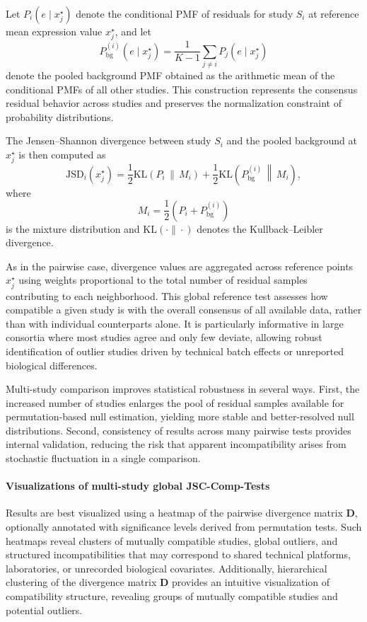 Let $P_i(e \mid x^\star_j)$ denote the conditional PMF of residuals for study $S_i$ at reference mean expression value $x^\star_j$, and let
\[
P_{\mathrm{bg}}^{(i)}(e \mid x^\star_j)
= \frac{1}{K-1} \sum_{j \neq i} P_j(e \mid x^\star_j)
\]
denote the pooled background PMF obtained as the arithmetic mean of the conditional PMFs of all other studies. This construction represents the consensus residual behavior across studies and preserves the normalization constraint of probability distributions.

The Jensen--Shannon divergence between study $S_i$ and the pooled background at $x^\star_j$ is then computed as
\[
\mathrm{JSD}_i(x^\star_j)
= \frac{1}{2} \mathrm{KL}\!\left(P_i \,\middle\|\, M_i \right)
+ \frac{1}{2} \mathrm{KL}\!\left(P_{\mathrm{bg}}^{(i)} \,\middle\|\, M_i \right),
\]
where
\[
M_i = \frac{1}{2} \left( P_i + P_{\mathrm{bg}}^{(i)} \right)
\]
is the mixture distribution and $\mathrm{KL}(\cdot\|\cdot)$ denotes the Kullback--Leibler divergence.

As in the pairwise case, divergence values are aggregated across reference points $x^\star_j$ using weights proportional to the total number of residual samples contributing to each neighborhood. This global reference test assesses how compatible a given study is with the overall consensus of all available data, rather than with individual counterparts alone. It is particularly informative in large consortia where most studies agree and only few deviate, allowing robust identification of outlier studies driven by technical batch effects or unreported biological differences.

Multi-study comparison improves statistical robustness in several ways. First, the increased number of studies enlarges the pool of residual samples available for permutation-based null estimation, yielding more stable and better-resolved null distributions. Second, consistency of results across many pairwise tests provides internal validation, reducing the risk that apparent incompatibility arises from stochastic fluctuation in a single comparison.

\paragraph{Visualizations of multi-study global JSC-Comp-Tests}
Results are best visualized using a heatmap of the pairwise divergence matrix $\mathbf{D}$, optionally annotated with significance levels derived from permutation tests. Such heatmaps reveal clusters of mutually compatible studies, global outliers, and structured incompatibilities that may correspond to shared technical platforms, laboratories, or unrecorded biological covariates. Additionally, hierarchical clustering of the divergence matrix $\mathbf{D}$ provides an intuitive visualization of compatibility structure, revealing groups of mutually compatible studies and potential outliers.

